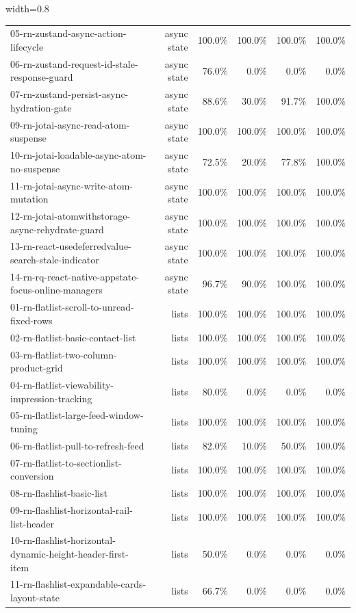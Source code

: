 \begin{table}[htbp]
\begin{adjustbox}{width=0.8\textwidth}
\begin{tabular}{lrrrrr}
05-rn-zustand-async-action-lifecycle & async state & 100.0\% & 100.0\% & 100.0\% & 100.0\% \\
06-rn-zustand-request-id-stale-response-guard & async state & 76.0\% & 0.0\% & 0.0\% & 0.0\% \\
07-rn-zustand-persist-async-hydration-gate & async state & 88.6\% & 30.0\% & 91.7\% & 100.0\% \\
09-rn-jotai-async-read-atom-suspense & async state & 100.0\% & 100.0\% & 100.0\% & 100.0\% \\
10-rn-jotai-loadable-async-atom-no-suspense & async state & 72.5\% & 20.0\% & 77.8\% & 100.0\% \\
11-rn-jotai-async-write-atom-mutation & async state & 100.0\% & 100.0\% & 100.0\% & 100.0\% \\
12-rn-jotai-atomwithstorage-async-rehydrate-guard & async state & 100.0\% & 100.0\% & 100.0\% & 100.0\% \\
13-rn-react-usedeferredvalue-search-stale-indicator & async state & 100.0\% & 100.0\% & 100.0\% & 100.0\% \\
14-rn-rq-react-native-appstate-focus-online-managers & async state & 96.7\% & 90.0\% & 100.0\% & 100.0\% \\
01-rn-flatlist-scroll-to-unread-fixed-rows & lists & 100.0\% & 100.0\% & 100.0\% & 100.0\% \\
02-rn-flatlist-basic-contact-list & lists & 100.0\% & 100.0\% & 100.0\% & 100.0\% \\
03-rn-flatlist-two-column-product-grid & lists & 100.0\% & 100.0\% & 100.0\% & 100.0\% \\
04-rn-flatlist-viewability-impression-tracking & lists & 80.0\% & 0.0\% & 0.0\% & 0.0\% \\
05-rn-flatlist-large-feed-window-tuning & lists & 100.0\% & 100.0\% & 100.0\% & 100.0\% \\
06-rn-flatlist-pull-to-refresh-feed & lists & 82.0\% & 10.0\% & 50.0\% & 100.0\% \\
07-rn-flatlist-to-sectionlist-conversion & lists & 100.0\% & 100.0\% & 100.0\% & 100.0\% \\
08-rn-flashlist-basic-list & lists & 100.0\% & 100.0\% & 100.0\% & 100.0\% \\
09-rn-flashlist-horizontal-rail-list-header & lists & 100.0\% & 100.0\% & 100.0\% & 100.0\% \\
10-rn-flashlist-horizontal-dynamic-height-header-first-item & lists & 50.0\% & 0.0\% & 0.0\% & 0.0\% \\
11-rn-flashlist-expandable-cards-layout-state & lists & 66.7\% & 0.0\% & 0.0\% & 0.0\% \\

\end{tabular}
\end{adjustbox}
\end{table}
